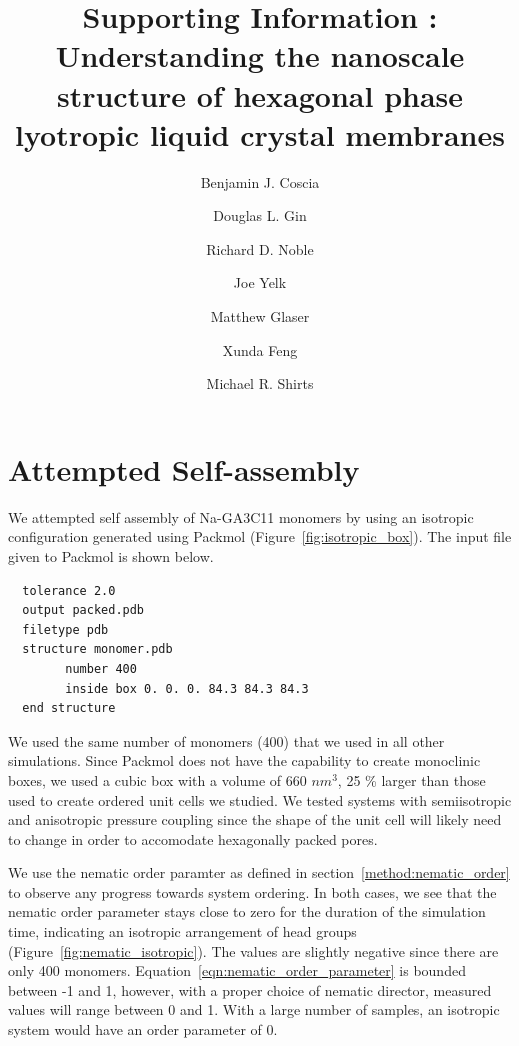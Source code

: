 \documentclass[journal=jpcbfk,manusciprt=article]{achemso}
\title{Supporting Information : Understanding the nanoscale structure of hexagonal phase lyotropic liquid crystal membranes}
\author{Benjamin J. Coscia \and Douglas L. Gin \and Richard D. Noble \and Joe Yelk \and Matthew Glaser \and Xunda Feng \and Michael R. Shirts}
\begin{document}
  
  \graphicspath{{./figures/}}  %
  \maketitle

  \section{Attempted Self-assembly}\label{section:self_assembly}
  
  We attempted self assembly of Na-GA3C11 monomers by using an isotropic configuration
  generated using Packmol \cite{martinez_packmol:_2009} (Figure~\ref{fig:isotropic_box}).
  The input file given to Packmol is shown below.
  
  \lstset{language=bash}
  \begin{lstlisting}
  tolerance 2.0
  output packed.pdb
  filetype pdb
  structure monomer.pdb
  		number 400
  		inside box 0. 0. 0. 84.3 84.3 84.3
  end structure
  \end{lstlisting}

  We used the same number of monomers (400) that we used in all other simulations. 
  Since Packmol does not have the capability to create monoclinic boxes, we used a cubic
  box with a volume of 660 $nm^3$, 25 \% larger than those used to create ordered unit
  cells we studied. We tested systems with semiisotropic and anisotropic pressure 
  coupling since the shape of the unit cell will likely need to change in order to 
  accomodate hexagonally packed pores.
  
  We use the nematic order paramter as defined in section~\ref{method:nematic_order} to 
  observe any progress towards system ordering. In both cases, we see that the nematic
  order parameter stays close to zero for the duration of the simulation time, indicating
  an isotropic arrangement of head groups (Figure~\ref{fig:nematic_isotropic}). The values
  are slightly negative since there are only 400 monomers. 
  Equation~\ref{eqn:nematic_order_parameter} is bounded between -1 and 1, however, with a
  proper choice of nematic director, measured values will range between 0 and 1. With a 
  large number of samples, an isotropic system would have an order parameter of 0.
  
\end{document}

